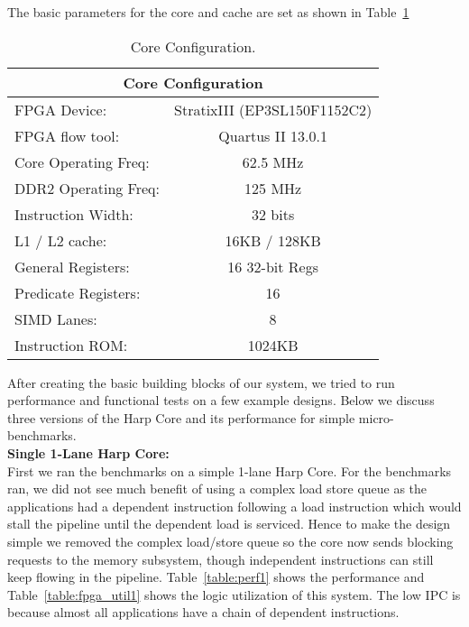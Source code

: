 The basic parameters for the core and cache are set as shown in Table~\ref{table:core_config}
\begin{table}[!htbp]
  \centering
  \begin{tabular}{|l|c|}
    \hline
    \multicolumn{2}{|c|}{Core Configuration} \\
    \hline
FPGA Device:				& StratixIII (EP3SL150F1152C2)\\
FPGA flow tool:				& Quartus II 13.0.1\\
Core Operating Freq:			& 62.5 MHz\\
DDR2 Operating Freq:			& 125 MHz\\
Instruction Width:			& 32 bits\\
L1 / L2 cache:				& 16KB / 128KB\\
General Registers:			& 16 32-bit Regs\\
Predicate Registers:			& 16\\
SIMD Lanes:				& 8\\
Instruction ROM:			& 1024KB\\
    \hline
  \end{tabular}
  \caption{Core Configuration.}
  \label{table:core_config}
\end{table}

After creating the basic building blocks of our system, we tried to run performance and functional tests on a few example designs. Below we discuss three versions of the Harp Core and its performance for simple micro-benchmarks.\\

\noindent\textbf{Single 1-Lane Harp Core:}\\
First we ran the benchmarks on a simple 1-lane Harp Core. For the benchmarks ran, we did not see much benefit of using a complex load store queue as the applications had a dependent instruction following a load instruction which would stall the pipeline until the dependent load is serviced. Hence to make the design simple we removed the complex load/store queue so the core now sends blocking requests to the memory subsystem, though independent instructions can still keep flowing in the pipeline. Table~\ref{table:perf1} shows the performance and Table~\ref{table:fpga_util1} shows the logic utilization of this system. The low IPC is because almost all applications have a chain of dependent instructions.  

